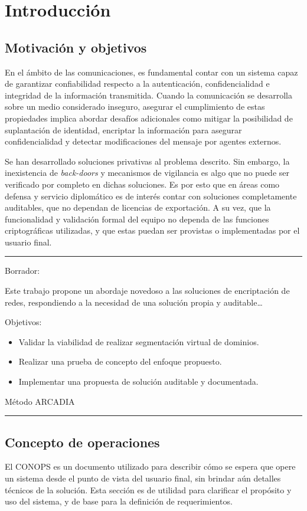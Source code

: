 \chapter{Introducción}
\section{Motivación y objetivos}
En el ámbito de las comunicaciones, es fundamental contar con un sistema capaz de garantizar confiabilidad respecto a la autenticación, confidencialidad e integridad de la información transmitida. Cuando la comunicación se desarrolla sobre un medio considerado inseguro, asegurar el cumplimiento de estas propiedades implica abordar desafíos adicionales como mitigar la posibilidad de suplantación de identidad, encriptar la información para asegurar confidencialidad y detectar modificaciones del mensaje por agentes externos.

Se han desarrollado soluciones privativas al problema descrito. Sin embargo, la inexistencia de \textit{back-doors} y mecanismos de vigilancia es algo que no puede ser verificado por completo en dichas soluciones. Es por esto que en áreas como defensa y servicio diplomático es de interés contar con soluciones completamente auditables, que no dependan de licencias de exportación. A su vez, que la funcionalidad y validación formal del equipo no dependa de las funciones criptográficas utilizadas, y que estas puedan ser provistas o implementadas por el usuario final.

\noindent\rule{\textwidth}{0.4pt}
Borrador:

Este trabajo propone un abordaje novedoso a las soluciones de encriptación de redes, respondiendo a la necesidad de una solución propia y auditable\dots

Objetivos:

\begin{itemize}
    \item Validar la viabilidad de realizar segmentación virtual de dominios.
    \item Realizar una prueba de concepto del enfoque propuesto.
    \item Implementar una propuesta de solución auditable y documentada.
\end{itemize}

Método ARCADIA

\noindent\rule{\textwidth}{0.4pt}

\clearpage

\section{Concepto de operaciones}
El CONOPS es un documento utilizado para describir cómo se espera que opere un sistema desde el punto de vista del usuario final, sin brindar aún detalles técnicos de la solución. Esta sección es de utilidad para clarificar el propósito y uso del sistema, y de base para la definición de requerimientos.

